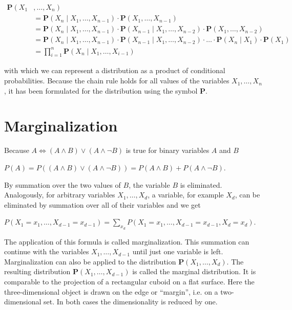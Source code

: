 \documentclass[10pt]{book}
\begin{document}
\begin{align*}
\boldsymbol{P}\left(X_{1}\right. & \left., \ldots, X_{n}\right) \\
& =\boldsymbol{P}\left(X_{n} \mid X_{1}, \ldots, X_{n-1}\right) \cdot \boldsymbol{P}\left(X_{1}, \ldots, X_{n-1}\right) \\
& =\boldsymbol{P}\left(X_{n} \mid X_{1}, \ldots, X_{n-1}\right) \cdot \boldsymbol{P}\left(X_{n-1} \mid X_{1}, \ldots, X_{n-2}\right) \cdot \boldsymbol{P}\left(X_{1}, \ldots, X_{n-2}\right) \\
& =\boldsymbol{P}\left(X_{n} \mid X_{1}, \ldots, X_{n-1}\right) \cdot \boldsymbol{P}\left(X_{n-1} \mid X_{1}, \ldots, X_{n-2}\right) \cdot \ldots \cdot \boldsymbol{P}\left(X_{n} \mid X_{1}\right) \cdot \boldsymbol{P}\left(X_{1}\right) \\
& =\prod_{i=1}^{n} \boldsymbol{P}\left(X_{n} \mid X_{1}, \ldots, X_{i-1}\right) \tag{7.1}
\end{align*}

with which we can represent a distribution as a product of conditional probabilities. Because the chain rule holds for all values of the variables $X_{1}, \ldots, X_{n}$, it has been formulated for the distribution using the symbol $\boldsymbol{P}$.

\section{Marginalization}
Because $A \Leftrightarrow(A \wedge B) \vee(A \wedge \neg B)$ is true for binary variables $A$ and $B$

$
P(A)=P((A \wedge B) \vee(A \wedge \neg B))=P(A \wedge B)+P(A \wedge \neg B) .
$

By summation over the two values of $B$, the variable $B$ is eliminated. Analogously, for arbitrary variables $X_{1}, \ldots, X_{d}$, a variable, for example $X_{d}$, can be eliminated by summation over all of their variables and we get

$
P\left(X_{1}=x_{1}, \ldots, X_{d-1}=x_{d-1}\right)=\sum_{x_{d}} P\left(X_{1}=x_{1}, \ldots, X_{d-1}=x_{d-1}, X_{d}=x_{d}\right) .
$

The application of this formula is called marginalization. This summation can continue with the variables $X_{1}, \ldots, X_{d-1}$ until just one variable is left. Marginalization can also be applied to the distribution $\boldsymbol{P}\left(X_{1}, \ldots, X_{d}\right)$. The resulting distribution $\boldsymbol{P}\left(X_{1}, \ldots, X_{d-1}\right)$ is called the marginal distribution. It is comparable to the projection of a rectangular cuboid on a flat surface. Here the three-dimensional object is drawn on the edge or ``margin'', i.e. on a two-dimensional set. In both cases the dimensionality is reduced by one.
\end{document}
